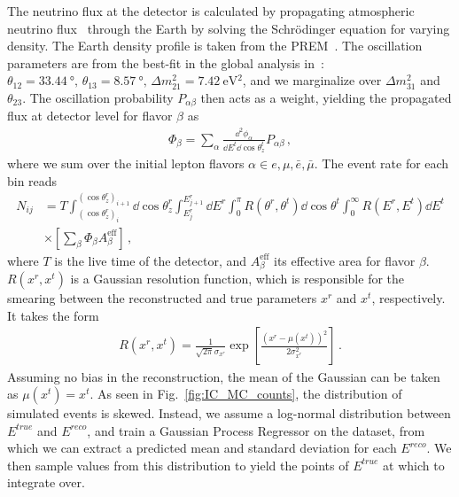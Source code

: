 \documentclass{article}
\begin{document}
The neutrino flux at the detector is calculated by propagating atmospheric neutrino flux~\cite{hondapaper} through the Earth by solving the 
Schrödinger equation for varying density. The Earth density profile is taken from the PREM~\cite{PREM}. The oscillation parameters are from the
best-fit in the global analysis in~\cite{nufit}: $\theta_{12} = \SI{33.44}{\degree},\, \theta_{13} = \SI{8.57}{\degree},\, \Delta m^2_{21} =  \SI{7.42}{\electronvolt^2}$, and we 
marginalize over $\Delta m^2_{31}$ and $\theta_{23}$.
The oscillation probability $P_{\alpha \beta}$ then acts as a weight, yielding the propagated flux at detector level for flavor $\beta$ as 
\begin{align}\label{eq:propFlux}
    \Phi_\beta = \sum_\alpha \frac{\dd^2 \phi_\alpha}{\dd E^t \dd \cos{\theta^t_z}} P_{\alpha\beta}\,,
\end{align}
where we sum over the initial lepton flavors $\alpha \in {e,\mu, \bar{e}, \bar{\mu}}$.
The event rate for each bin reads
\begin{align}\label{eq:events}
    N_{ij} &= T \int_{(\cos{\theta_z^r})_i}^{(\cos{\theta_z^r})_{i+1}} \dd \cos{\theta^r_z} \int_{E^r_{j}}^{E^r_{j+1}} \dd E^r \int_0^\pi R(\theta^r,\theta^t) \dd \cos{\theta^t} \int_0^\infty R(E^r,E^t) \dd E^t \nonumber\\
        &\times \left[ \sum_\beta \Phi_\beta  A^\text{eff}_\beta\right]\,,
\end{align}
where $T$ is the live time of the detector, and $A^\text{eff}_\beta$ its effective area for flavor $\beta$. $R(x^r,x^t)$ is a Gaussian resolution function, 
which is responsible for the smearing between the reconstructed and true parameters $x^r$ and $x^t$, respectively. It takes the form 
\begin{align}
    R(x^r, x^t) = \frac{1}{\sqrt{2\pi} \sigma_{x^r}} \exp\left[\frac{(x^r-\mu(x^t))^2}{2\sigma_{x^r}^2}\right]\,.
\end{align}
Assuming no bias in the reconstruction, the mean of the Gaussian can be taken as $\mu(x^t) = x^t$. As seen in Fig.~\ref{fig:IC_MC_counts}, the distribution of 
simulated events is skewed. Instead, we assume a log-normal distribution between $E^{true}$ and $E^{reco}$, and train a Gaussian Process Regressor on the dataset, from which
we can extract a predicted mean and standard deviation for each $E^{reco}$. We then sample values from this distribution to yield 
the points of $E^{true}$ at which to integrate over. 
\end{document}
